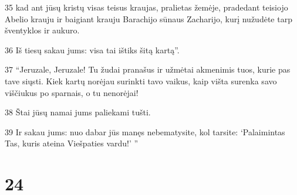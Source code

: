 \par 35 kad ant jūsų kristų visas teisus kraujas, pralietas žemėje, pradedant teisiojo Abelio krauju ir baigiant krauju Barachijo sūnaus Zacharijo, kurį nužudėte tarp šventyklos ir aukuro. 
\par 36 Iš tiesų sakau jums: visa tai ištiks šitą kartą”. 
\par 37 “Jeruzale, Jeruzale! Tu žudai pranašus ir užmėtai akmenimis tuos, kurie pas tave siųsti. Kiek kartų norėjau surinkti tavo vaikus, kaip višta surenka savo viščiukus po sparnais, o tu nenorėjai! 
\par 38 Štai jūsų namai jums paliekami tušti. 
\par 39 Ir sakau jums: nuo dabar jūs manęs nebematysite, kol tarsite: ‘Palaimintas Tas, kuris ateina Viešpaties vardu!’ ”



\chapter{24}


